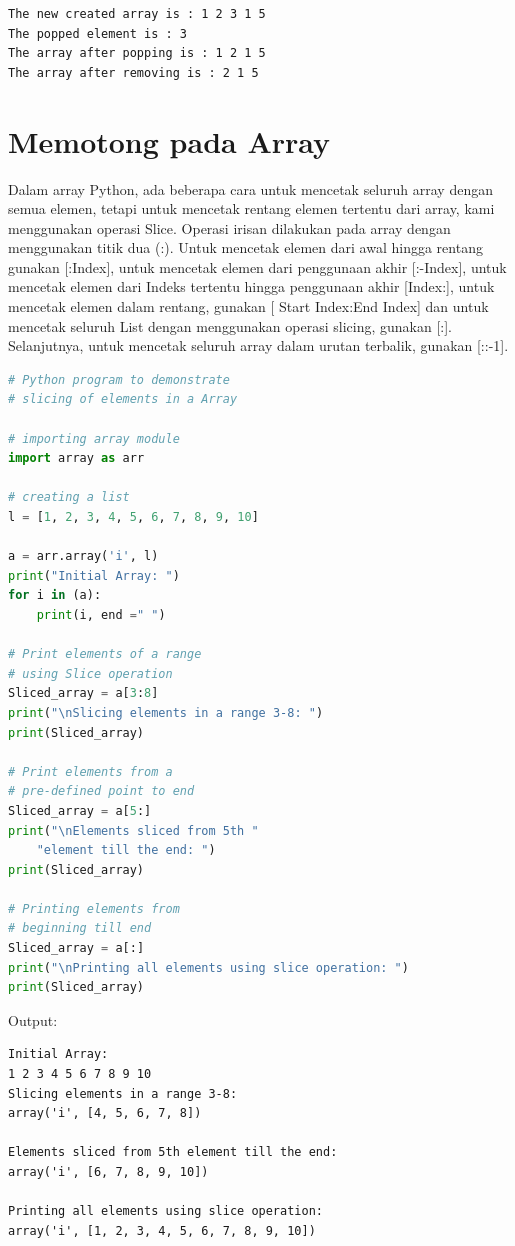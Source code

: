 \begin{lstlisting}
The new created array is : 1 2 3 1 5 
The popped element is : 3
The array after popping is : 1 2 1 5 
The array after removing is : 2 1 5 
\end{lstlisting}

\section{Memotong pada Array}

Dalam array Python, ada beberapa cara untuk mencetak seluruh array dengan semua elemen, tetapi untuk mencetak rentang elemen tertentu dari array, kami menggunakan operasi Slice. Operasi irisan dilakukan pada array dengan menggunakan titik dua (:). Untuk mencetak elemen dari awal hingga rentang gunakan [:Index], untuk mencetak elemen dari penggunaan akhir [:-Index], untuk mencetak elemen dari Indeks tertentu hingga penggunaan akhir [Index:], untuk mencetak elemen dalam rentang, gunakan [ Start Index:End Index] dan untuk mencetak seluruh List dengan menggunakan operasi slicing, gunakan [:]. Selanjutnya, untuk mencetak seluruh array dalam urutan terbalik, gunakan [::-1].

\begin{lstlisting}[language=python, caption=Memotong Elemen Array]
# Python program to demonstrate
# slicing of elements in a Array

# importing array module
import array as arr

# creating a list
l = [1, 2, 3, 4, 5, 6, 7, 8, 9, 10]

a = arr.array('i', l)
print("Initial Array: ")
for i in (a):
	print(i, end =" ")

# Print elements of a range
# using Slice operation
Sliced_array = a[3:8]
print("\nSlicing elements in a range 3-8: ")
print(Sliced_array)

# Print elements from a
# pre-defined point to end
Sliced_array = a[5:]
print("\nElements sliced from 5th "
	"element till the end: ")
print(Sliced_array)

# Printing elements from
# beginning till end
Sliced_array = a[:]
print("\nPrinting all elements using slice operation: ")
print(Sliced_array)
\end{lstlisting}

Output:

\begin{lstlisting}
Initial Array: 
1 2 3 4 5 6 7 8 9 10 
Slicing elements in a range 3-8: 
array('i', [4, 5, 6, 7, 8])

Elements sliced from 5th element till the end: 
array('i', [6, 7, 8, 9, 10])

Printing all elements using slice operation: 
array('i', [1, 2, 3, 4, 5, 6, 7, 8, 9, 10])
\end{lstlisting}

